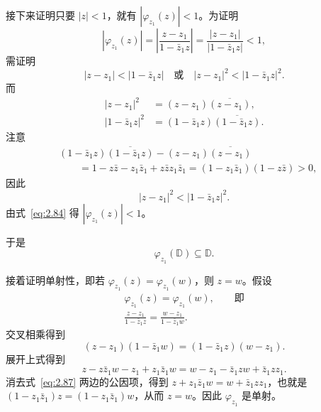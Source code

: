 接下来证明只要 $|z|<1$，就有 $|\varphi_{z_1}(z)|<1$。为证明
\begin{equation*}
  |\varphi_{z_1}(z)|=
  \left|\frac{z-z_1}{1-\bar z_1z}\right|=
  \frac{|z-z_1|}{|1-\bar z_1z|}<1,
  \tag{2.83}\label{eq:2.83}
\end{equation*}
需证明
\[
  |z-z_1|<|1-\bar z_1z|
  \quad\text{或}\quad |z-z_1|^2<|1-\bar z_1z|^2.
\]
而
\[
  \begin{aligned}
    |z-z_1|^2&=(z-z_1)\overline{(z-z_1)},\\
    |1-\bar z_1z|^2&=(1-\bar z_1z)\overline{(1-\bar z_1z)}.
  \end{aligned}
\]
注意
\[
  \begin{aligned}
    &(1-\bar z_1z)\overline{(1-\bar z_1z)}
      -(z-z_1)\overline{(z-z_1)}\\
    &\qquad=1-z\bar z-z_1\bar z_1+z\bar z z_1\bar z_1
       =(1-z_1\bar z_1)(1-z\bar z)>0,
  \end{aligned}
\]
因此
\begin{equation*}
  |z-z_1|^2<|1-\bar z_1z|^2.
  \tag{2.84}\label{eq:2.84}
\end{equation*}
由式~\eqref{eq:2.84} 得 $|\varphi_{z_1}(z)|<1$。

于是
\begin{equation*}
  \varphi_{z_1}(\mathbb D)\subseteq\mathbb D.
  \tag{2.85}\label{eq:2.85}
\end{equation*}

接着证明单射性，即若 $\varphi_{z_1}(z)=\varphi_{z_1}(w)$，则 $z=w$。假设
\begin{equation*}
  \begin{gathered}
    \varphi_{z_1}(z)=\varphi_{z_1}(w),\qquad\text{即}\\
    \frac{z-z_1}{1-\bar z_1z}=\frac{w-z_1}{1-\bar z_1w}.
  \end{gathered}
  \tag{2.86}\label{eq:2.86}
\end{equation*}
交叉相乘得到
\[
  (z-z_1)(1-\bar z_1w)=(1-\bar z_1z)(w-z_1).
\]
展开上式得到
\begin{equation*}
  z-z\bar z_1w-z_1+z_1\bar z_1w=w-z_1-\bar z_1zw+\bar z_1zz_1.
  \tag{2.87}\label{eq:2.87}
\end{equation*}
消去式~\eqref{eq:2.87} 两边的公因项，得到 $z+z_1\bar z_1w=w+\bar z_1zz_1$，也就是 $(1-z_1\bar z_1)z=(1-z_1\bar z_1)w$，从而 $z=w$。因此 $\varphi_{z_1}$ 是单射。

